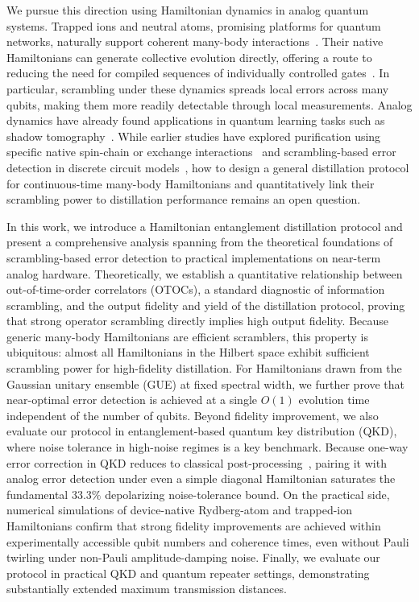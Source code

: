 \documentclass[onecolumn,prx,longbibliography,nofootinbib, superscriptaddress]{revtex4-2}
\theoremstyle{recap}
\begin{document}
We pursue this direction using Hamiltonian dynamics in analog quantum systems. Trapped ions and neutral atoms, promising platforms for quantum networks, naturally support coherent many-body interactions~\cite{Bloch2012, Hu2019, Bernien2017}. Their native Hamiltonians can generate collective evolution directly, offering a route to reducing the need for compiled sequences of individually controlled gates~\cite{SimuQ}. In particular, scrambling under these dynamics spreads local errors across many qubits, making them more readily detectable through local measurements. Analog dynamics have already found applications in quantum learning tasks such as shadow tomography~\cite{Tran2023, HamiltonianShadow}. While earlier studies have explored purification using specific native spin-chain or exchange interactions~\cite{Maruyama2008,Auer2014} and scrambling-based error detection in discrete circuit models~\cite{gu2025}, how to design a general distillation protocol for continuous-time many-body Hamiltonians and quantitatively link their scrambling power to distillation performance remains an open question.

In this work, we introduce a Hamiltonian entanglement distillation protocol and present a comprehensive analysis spanning from the theoretical foundations of scrambling-based error detection to practical implementations on near-term analog hardware. Theoretically, we establish a quantitative relationship between out-of-time-order correlators (OTOCs), a standard diagnostic of information scrambling, and the output fidelity and yield of the distillation protocol, proving that strong operator scrambling directly implies high output fidelity. Because generic many-body Hamiltonians are efficient scramblers, this property is ubiquitous: almost all Hamiltonians in the Hilbert space exhibit sufficient scrambling power for high-fidelity distillation. For Hamiltonians drawn from the Gaussian unitary ensemble (GUE) at fixed spectral width, we further prove that near-optimal error detection is achieved at a single $O(1)$ evolution time independent of the number of qubits. Beyond fidelity improvement, we also evaluate our protocol in entanglement-based quantum key distribution (QKD), where noise tolerance in high-noise regimes is a key benchmark. Because one-way error correction in QKD reduces to classical post-processing~\cite{ShorPreskill2000, Liu2022classically}, pairing it with analog error detection under even a simple diagonal Hamiltonian saturates the fundamental $33.3\%$ depolarizing noise-tolerance bound. On the practical side, numerical simulations of device-native Rydberg-atom and trapped-ion Hamiltonians confirm that strong fidelity improvements are achieved within experimentally accessible qubit numbers and coherence times, even without Pauli twirling under non-Pauli amplitude-damping noise. Finally, we evaluate our protocol in practical QKD and quantum repeater settings, demonstrating substantially extended maximum transmission distances.
\end{document}
